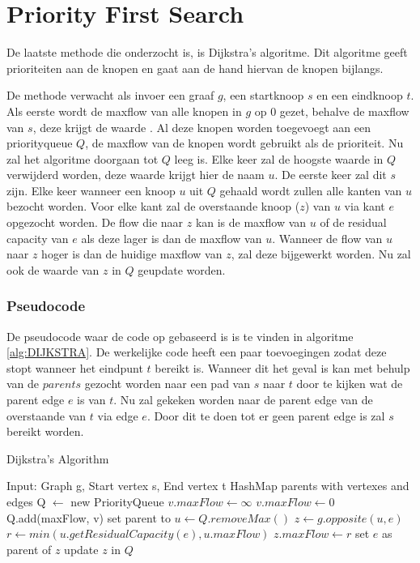 \chapter{Priority First Search}
\label{chap:priorityfirst}

De laatste methode die onderzocht is, is Dijkstra's algoritme. Dit algoritme geeft prioriteiten aan de knopen en gaat aan de hand hiervan de knopen bijlangs.

De methode verwacht als invoer een graaf $g$, een startknoop $s$ en een eindknoop $t$.
Als eerste wordt de maxflow van alle knopen in $g$ op 0 gezet, behalve de maxflow van $s$, deze krijgt de waarde \infty. Al deze knopen worden toegevoegt aan een priorityqueue $Q$, de maxflow van de knopen wordt gebruikt als de prioriteit.
Nu zal het algoritme doorgaan tot $Q$ leeg is. Elke keer zal de hoogste waarde in $Q$ verwijderd worden, deze waarde krijgt hier de naam $u$. De eerste keer zal dit $s$ zijn. Elke keer wanneer een knoop $u$ uit $Q$ gehaald wordt zullen alle kanten van $u$ bezocht worden. Voor elke kant zal de overstaande knoop ($z$) van $u$ via kant $e$ opgezocht worden. De flow die naar $z$ kan is de maxflow van $u$ of de residual capacity van $e$ als deze lager is dan de maxflow van $u$. Wanneer de flow van $u$ naar $z$ hoger is dan de huidige maxflow van $z$, zal deze bijgewerkt worden. Nu zal ook de waarde van $z$ in $Q$ geupdate worden.

\subsection{Pseudocode}
De pseudocode waar de code op gebaseerd is is te vinden in algoritme \ref{alg:DIJKSTRA}.
De werkelijke code heeft een paar toevoegingen zodat deze stopt wanneer het eindpunt $t$ bereikt is. Wanneer dit het geval is kan met behulp van de $parents$ gezocht worden naar een pad van $s$ naar $t$ door te kijken wat de parent edge $e$ is van $t$. Nu zal gekeken worden naar de parent edge van de overstaande van $t$ via edge $e$. Door dit te doen tot er geen parent edge is zal $s$ bereikt worden.

\begin{algorithm}[h]
\caption{Dijkstra's Algorithm}
\label{alg:DIJKSTRA}
\begin{algorithmic}
\REQUIRE Input: Graph g, Start vertex s, End vertex t
\STATE HashMap parents with vertexes and edges
\STATE Q $\gets$ new PriorityQueue
\STATE $v.maxFlow \gets \infty$
\ELSE
\STATE $v.maxFlow \gets 0$
\ENDIF
\STATE Q.add(maxFlow, v)
\STATE set parent to \emptyset
\ENDFOR
{}
\STATE $u \gets Q.removeMax()$
\STATE $z \gets g.opposite(u, e)$
\STATE $r \gets min(u.getResidualCapacity(e), u.maxFlow)$
\STATE $z.maxFlow \gets r$
\STATE set $e$ as parent of $z$
\STATE update $z$ in $Q$
\ENDIF
\ENDFOR
\ENDWHILE
\end{algorithmic}
\end{algorithm}

